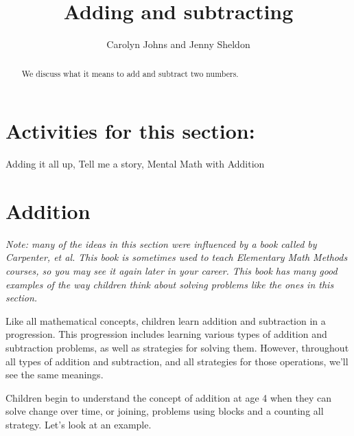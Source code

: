 \documentclass{ximera}
\title{Adding and subtracting}
\author{Carolyn Johns and Jenny Sheldon}
\begin{document}
\begin{abstract}
We discuss what it means to add and subtract two numbers.
\end{abstract}
\maketitle

\section{Activities for this section:} Adding it all up, Tell me a story, Mental Math with Addition


\section{Addition}

\emph{Note: many of the ideas in this section were influenced by a book called  by Carpenter, et al. This book is sometimes used to teach Elementary Math Methods courses, so you may see it again later in your career. This book has many good examples of the way children think about solving problems like the ones in this section.}



Like all mathematical concepts, children learn addition and subtraction in a progression. This progression includes learning various types of addition and subtraction problems, as well as strategies for solving them. However, throughout all types of addition and subtraction, and all strategies for those operations, we'll see the same meanings.

Children begin to understand the concept of addition at age 4 when they can solve change over time, or joining, problems using blocks and a counting all strategy. Let's look at an example.
\end{document}
